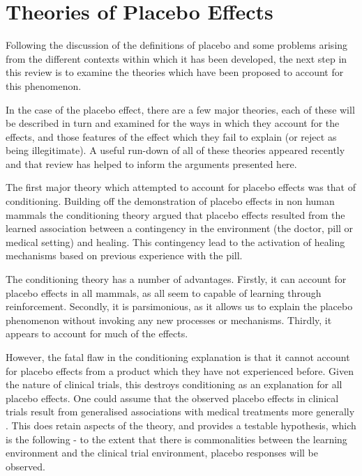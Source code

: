 
\section{Theories of Placebo Effects}
\label{sec:theor-plac-effects}

Following the discussion of the definitions of placebo and some problems arising from the different contexts within which it has been developed, the next step in this review is to examine the theories which have been proposed to account for this phenomenon. 

In the case of the placebo effect, there are a few major theories, each of these will be described in turn  and examined for the ways in which they account for the effects, and those features of the effect which they fail to explain (or reject as being illegitimate). A useful run-down of all of these theories appeared recently \cite{Stewart-Williams2004b} and that review has helped to inform the arguments presented here. 

The first major theory which attempted to account for placebo effects was that of conditioning. Building off the demonstration of placebo effects in non human mammals \cite{Herrnstein1962} the conditioning theory argued that placebo effects resulted from the learned association between a contingency in the environment (the doctor, pill or medical setting) and healing. This contingency lead to the activation of healing mechanisms based on previous experience with the pill. 

The conditioning theory has a number of advantages. Firstly, it can account for placebo effects in all mammals, as all seem to capable of learning through reinforcement. Secondly, it is parsimonious, as it allows us to explain the placebo phenomenon without invoking any new processes or mechanisms. Thirdly, it appears to account for much of the effects. 

However, the fatal flaw in the conditioning explanation is that it cannot account for placebo effects from a product which they have not experienced before. Given the nature of clinical trials, this destroys  conditioning as an explanation for all placebo effects.  One could assume that the observed placebo effects in clinical trials result from generalised associations with medical treatments more generally \cite{pearce1987model}. This does retain aspects of the theory, and provides a testable hypothesis, which is the following - to the extent that there is commonalities between the learning environment and the clinical trial environment, placebo responses will be observed.  

